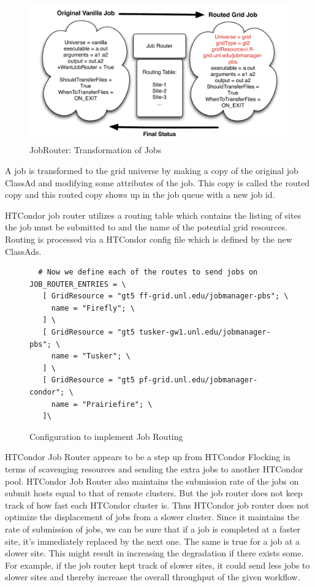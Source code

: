 \documentclass[ms,electronic,double]{nuthesis}
\begin{document}
\begin{figure}[htbp!]
\begin{center}
\includegraphics[scale=0.75]{images/jobRouter}
\caption{JobRouter: Transformation of Jobs}
\label{fig:JobRouter}
\end{center}
\end{figure}

A job is transformed to the grid universe by making a copy of the original job 
ClassAd and modifying some attributes of the job. This copy is called the routed 
copy and this routed copy shows up in the job queue with a new job id\cite{manual56}.

HTCondor job router utilizes a routing table which contains the listing of sites 
the job must be submitted to and the name of the potential grid resources. Routing is processed via a  HTCondor config file which is defined by the new ClassAds.

\begin{figure}
\begin{lstlisting}
  # Now we define each of the routes to send jobs on
JOB_ROUTER_ENTRIES = \
   [ GridResource = "gt5 ff-grid.unl.edu/jobmanager-pbs"; \
     name = "Firefly"; \
   ] \
   [ GridResource = "gt5 tusker-gw1.unl.edu/jobmanager-pbs"; \
     name = "Tusker"; \
   ] \
   [ GridResource = "gt5 pf-grid.unl.edu/jobmanager-condor"; \
     name = "Prairiefire"; \
   ]\

\end{lstlisting}
\caption{Configuration to implement Job Routing}
\end{figure}

HTCondor Job Router appears to be a step up from HTCondor Flocking in terms of 
scavenging resources and sending the extra jobs to another HTCondor pool. HTCondor 
Job Router also maintains the submission rate of the jobs on submit hosts equal to that of remote clusters. But the job 
router does not keep track of how fast each HTCondor cluster is. Thus 
HTCondor job router does not optimize the displacement of jobs from a slower 
cluster. Since it maintains the rate of submission of jobs, we can be sure that if a job is completed 
at a faster site, it's immediately replaced by the next one. The same is true for a job at a slower site.
This might result in increasing the degradation if there exists some. For example, if the job router kept track of slower sites, it
could send less jobs to slower sites and thereby increase the overall throughput of the given workflow.
\end{document}
